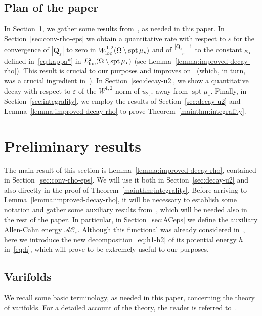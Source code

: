 \documentclass[a4paper, 11pt, twoside, leqno]{article}
\theoremstyle{definition}              %
\theoremstyle{remark}                  %
\DeclareMathOperator{\spt}{spt}                                     %
\newcommand{\abs}[1]{\left| #1 \right|}                             %
\newcommand{\Q}{\mathbf{Q}}
\newcommand{\eps}{\varepsilon}
\begin{document}
\subsection*{Plan of the paper}
In Section~\ref{sec:preliminary}, we gather some results from~\cite{CDS1, CDS2}, 
as needed in this paper. In Section~\ref{sec:conv-rho-eps} we obtain a quantitative 
rate with respect 
to $\eps$ for the convergence of $\abs{\Q_\eps}$ to zero in 
$W^{1,2}_{\rm loc}(\Omega \setminus \spt\mu_\star)$
and of $\frac{\abs{\Q_\eps} - 1}{\eps}$ to the constant 
$\kappa_\star$ defined in~\eqref{eq:kappa*} in 
$L^2_{\rm loc}(\Omega \setminus \spt\mu_\star)$ (see Lemma~\ref{lemma:improved-decay-rho}). This result   
is crucial to our purposes and improves on~\cite[Lemma~3.7]{CDS1} 
(which, in turn, was a crucial ingredient in~\cite{CDS1,CDS2}). 
In Section~\ref{sec:decay-u2}, we show a quantitative decay with respect 
to $\eps$ of the $W^{1,2}$-norm of $u_{2,\eps}$ away from $\spt\mu_\star$. 
Finally, in Section~\ref{sec:integrality}, we employ the results of Section~\ref{sec:decay-u2} and Lemma~\ref{lemma:improved-decay-rho} 
to prove Theorem~\ref{mainthm:integrality}. 

\section{Preliminary results}\label{sec:preliminary}


\setcounter{equation}{0}
\setcounter{theorem}{0}

The main result of this section is Lemma~\ref{lemma:improved-decay-rho}, 
contained in Section~\ref{sec:conv-rho-eps}. 
We will use it both in Section~\ref{sec:decay-u2} and also directly in 
the proof of Theorem~\ref{mainthm:integrality}. Before arriving to 
Lemma~\ref{lemma:improved-decay-rho}, it will be necessary to establish 
some notation and gather some auxiliary results from~\cite{CDS1, CDS2}, which 
will be needed also in the rest of the paper. In particular, 
in Section~\ref{sec:ACeps} we define the auxiliary Allen-Cahn 
energy $\mathcal{AC}_\eps$. Although this functional was already considered 
in~\cite{CMSW, CDS1}, here we introduce the new decomposition~\eqref{eq:h1-h2} 
of its potential energy $h$ in~\eqref{eq:h}, which will prove to be extremely 
useful to our purposes.


\subsection{Varifolds}
We recall some basic terminology, as needed in this paper, 
concerning the theory of varifolds. For a detailed account 
of the theory, the reader is referred to~\cite{Simon}.
\end{document}
